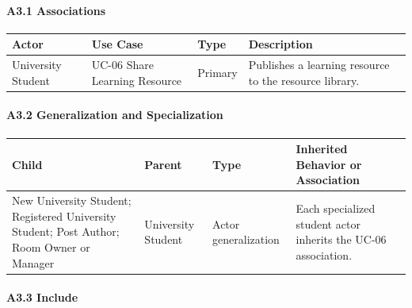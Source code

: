 \documentclass[12pt]{article}
\renewcommand{\baselinestretch}{1.5}
\begin{document}
\hypertarget{sec:a3-1-associations}{}
\paragraph*{A3.1 Associations}
\par\medskip

\begingroup
\small
\renewcommand{\baselinestretch}{1.0}\selectfont
\renewcommand{\arraystretch}{1.15}
\setlength{\tabcolsep}{6pt}
\begin{longtable}{|>{\raggedright\arraybackslash}p{}|>{\raggedright\arraybackslash}p{}|>{\raggedright\arraybackslash}p{}|>{\raggedright\arraybackslash}p{}|}
\hline
\textbf{Actor} & \textbf{Use Case} & \textbf{Type} & \textbf{Description} \\ \hline
\endhead
University Student & UC-06 Share Learning Resource & Primary & Publishes a learning resource to the resource library. \\ \hline
\end{longtable}
\endgroup
\par\medskip

\hypertarget{sec:a3-2-generalization-and-specialization}{}
\paragraph*{A3.2 Generalization and Specialization}
\par\medskip

\begingroup
\small
\renewcommand{\baselinestretch}{1.0}\selectfont
\renewcommand{\arraystretch}{1.15}
\setlength{\tabcolsep}{6pt}
\begin{longtable}{|>{\raggedright\arraybackslash}p{}|>{\raggedright\arraybackslash}p{}|>{\raggedright\arraybackslash}p{}|>{\raggedright\arraybackslash}p{}|}
\hline
\textbf{Child} & \textbf{Parent} & \textbf{Type} & \textbf{Inherited Behavior or Association} \\ \hline
\endhead
New University Student; Registered University Student; Post Author; Room Owner or Manager & University Student & Actor generalization & Each specialized student actor inherits the UC-06 association. \\ \hline
\end{longtable}
\endgroup
\par\medskip

\hypertarget{sec:a3-3-include}{}
\paragraph*{A3.3 Include}
\par\medskip
\end{document}
